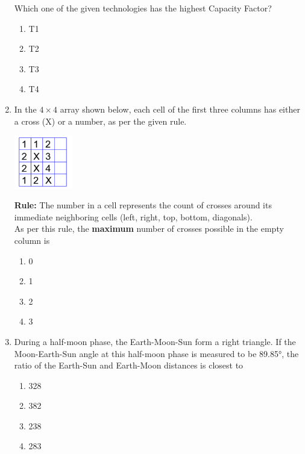 \documentclass[journal,12pt,onecolumn]{exam}
\theoremstyle{remark}
\begin{document}
\begin{enumerate}
    Which one of the given technologies has the highest Capacity Factor?

    \begin{enumerate}[label=\alph*)]
        \item T1
        \item T2
        \item T3
        \item T4
    \end{enumerate}

\newpage
\item In the $4 \times 4$ array shown below, each cell of the first three columns has either a cross (X) or a number, as per the given rule.

    \begin{center}
        \includegraphics[width=0.2\textwidth]{figs/a3q9.png}
    \end{center}

    \textbf{Rule:} The number in a cell represents the count of crosses around its immediate neighboring cells (left, right, top, bottom, diagonals). \\
    As per this rule, the \textbf{maximum} number of crosses possible in the empty column is

    \begin{enumerate}[label=\alph*)]
        \item 0
        \item 1
        \item 2
        \item 3
    \end{enumerate}

 \item During a half-moon phase, the Earth-Moon-Sun form a right triangle. If the Moon-Earth-Sun angle at this half-moon phase is measured to be 89.85°, the ratio of the Earth-Sun and Earth-Moon distances is closest to
    
    \begin{enumerate}[label=\alph*)]
        \item 328
        \item 382
        \item 238
        \item 283
    \end{enumerate}


\end{enumerate}
\end{document}
